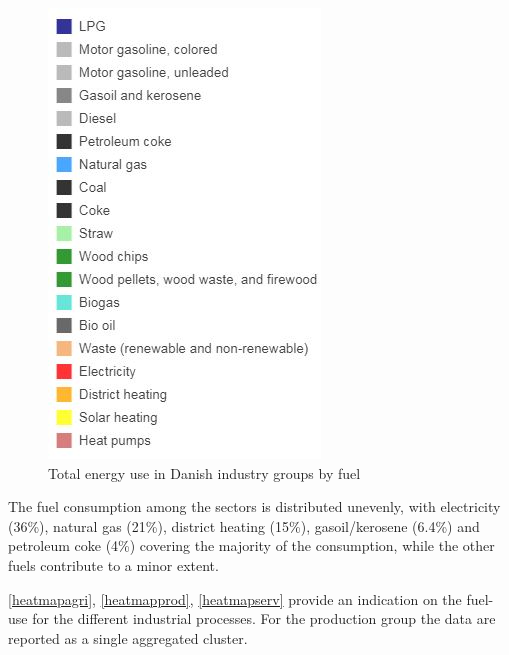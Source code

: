 \documentclass[review]{elsarticle}
\begin{document}
\begin{figure}
\begin{minipage}{.3\textwidth}
  \includegraphics[width=\linewidth]{Img/dan_ind/legend}
\end{minipage}
  \caption{Total energy use in Danish industry groups by fuel \cite{VM2015}}
  \label{total_use} 
\end{figure}

The fuel consumption among the sectors is distributed unevenly, with electricity (36\%), natural gas (21\%), district heating (15\%), gasoil/kerosene (6.4\%) and petroleum coke (4\%) covering the majority of the consumption, while the other fuels contribute to a minor extent.


\iffalse
\autoref{heatmapagri}, \autoref{heatmapprod}, \autoref{heatmapserv} provide an indication on the fuel-use for the different industrial processes. For the production group the data are reported as a single aggregated cluster.
\end{document}
